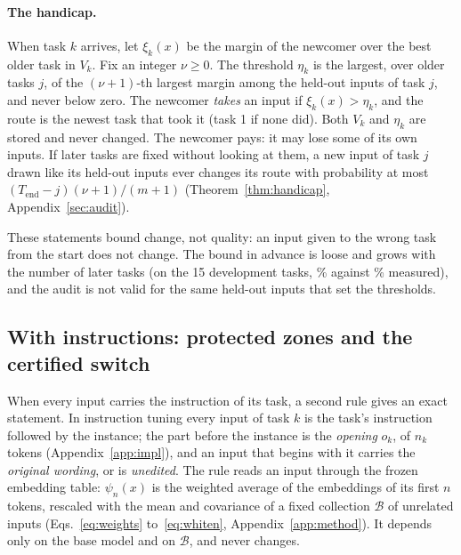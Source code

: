 \paragraph{The handicap.} When task $k$ arrives, let $\xi_k(x)$ be the margin of the newcomer over
the best older task in $V_k$. Fix an integer $\nu \ge 0$. The threshold $\eta_k$ is the largest, over
older tasks $j$, of the $(\nu+1)$-th largest margin among the held-out inputs of task $j$, and never
below zero. The newcomer \emph{takes} an input if $\xi_k(x) > \eta_k$, and the route is the newest task
that took it (task 1 if none did). Both $V_k$ and $\eta_k$ are stored and never changed. The
newcomer pays: it may lose some of its own inputs. If later tasks are fixed without looking at them,
a new input of task $j$ drawn like its held-out inputs ever changes its route with probability at
most $(T_{\mathrm{end}}-j)(\nu+1)/(m+1)$ (Theorem~\ref{thm:handicap}, Appendix~\ref{sec:audit}).

These statements bound change, not quality: an input given to the wrong task from the start does not
change. The bound in advance is loose and grows with the number of later tasks (on the 15
development tasks, \AudDevHPrimeTTwoBound{}\% against \AudDevHPrimeTTwoChanged{}\% measured), and the audit is not valid
for the same held-out inputs that set the thresholds.

\subsection{With instructions: protected zones and the certified switch}
\label{sec:features}\label{sec:zones}\label{sec:switch}\label{sec:guarantee}

When every input carries the instruction of its task, a second rule gives an exact statement. In
instruction tuning every input of task $k$ is the task's instruction followed by the instance; the
part before the instance is the \emph{opening} $o_k$, of $n_k$ tokens (Appendix~\ref{app:impl}), and
an input that begins with it carries the \emph{original wording}, or is \emph{unedited}. The rule
reads an input through the frozen embedding table: $\psi_n(x)$ is the weighted average
\citep{arora2017simple} of the embeddings of its first $n$ tokens, rescaled with the mean and
covariance of a fixed collection $\mathcal{B}$ of unrelated inputs (Eqs.~\eqref{eq:weights}
to~\eqref{eq:whiten}, Appendix~\ref{app:method}). It depends only on the base model and on
$\mathcal{B}$, and never changes.


